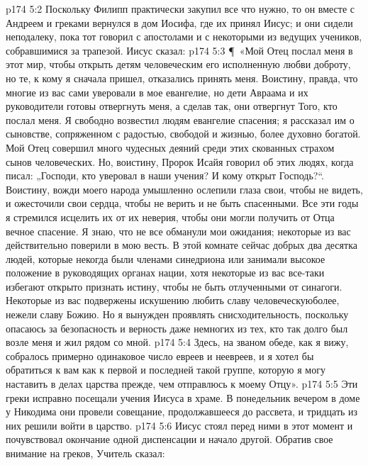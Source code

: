 \vs p174 5:2 Поскольку Филипп практически закупил все что нужно, то он вместе с Андреем и греками вернулся в дом Иосифа, где их принял Иисус; и они сидели неподалеку, пока тот говорил с апостолами и с некоторыми из ведущих учеников, собравшимися за трапезой. Иисус сказал:
\vs p174 5:3 \P\ «Мой Отец послал меня в этот мир, чтобы открыть детям человеческим его исполненную любви доброту, но те, к кому я сначала пришел, отказались принять меня. Воистину, правда, что многие из вас сами уверовали в мое евангелие, но дети Авраама и их руководители готовы отвергнуть меня, а сделав так, они отвергнут Того, кто послал меня. Я свободно возвестил людям евангелие спасения; я рассказал им о сыновстве, сопряженном с радостью, свободой и жизнью, более духовно богатой. Мой Отец совершил много чудесных деяний среди этих скованных страхом сынов человеческих. Но, воистину, Пророк Исайя говорил об этих людях, когда писал: „Господи, кто уверовал в наши учения? И кому открыт Господь?“. Воистину, вожди моего народа умышленно ослепили глаза свои, чтобы не видеть, и ожесточили свои сердца, чтобы не верить и не быть спасенными. Все эти годы я стремился исцелить их от их неверия, чтобы они могли получить от Отца вечное спасение. Я знаю, что не все обманули мои ожидания; некоторые из вас действительно поверили в мою весть. В этой комнате сейчас добрых два десятка людей, которые некогда были членами синедриона или занимали высокое положение в руководящих органах нации, хотя некоторые из вас все\hyp{}таки избегают открыто признать истину, чтобы не быть отлученными от синагоги. Некоторые из вас подвержены искушению любить славу человеческуюболее, нежели славу Божию. Но я вынужден проявлять снисходительность, поскольку опасаюсь за безопасность и верность даже немногих из тех, кто так долго был возле меня и жил рядом со мной.
\vs p174 5:4 Здесь, на званом обеде, как я вижу, собралось примерно одинаковое число евреев и неевреев, и я хотел бы обратиться к вам как к первой и последней такой группе, которую я могу наставить в делах царства прежде, чем отправлюсь к моему Отцу».
\vs p174 5:5 Эти греки исправно посещали учения Иисуса в храме. В понедельник вечером в доме у Никодима они провели совещание, продолжавшееся до рассвета, и тридцать из них решили войти в царство.
\vs p174 5:6 Иисус стоял перед ними в этот момент и почувствовал окончание одной диспенсации и начало другой. Обратив свое внимание на греков, Учитель сказал:
